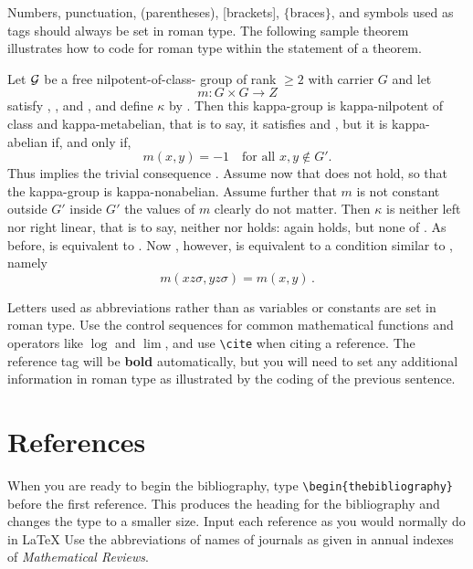 Numbers, punctuation, (parentheses), [brackets], $\{$braces$\}$, and
symbols used as tags should always be set in roman type.  The following
sample theorem illustrates how to code for roman type within the
statement of a theorem.

\begin{lemma}
Let $\cal G$ be a free nilpotent-of-class- group of rank
$\ge 2$ with carrier $G$ and let
$$m : G\times G \to Z$$
satisfy , , and , and define
$\kappa$ by .  Then this kappa-group is kappa-nilpotent
of class  and kappa-metabelian, that is to say, it satisfies
 and , but it is kappa-abelian if, and only if,
$$m(x,y) = -1\quad\text{for all $x, y \notin G'$}.
$$
\rom{(}Thus  implies the trivial consequence
.\rom{)}  Assume now that  does not hold,
so that the kappa-group is kappa-nonabelian.  Assume further that $m$
is not constant outside $G'$ \rom{(}inside $G'$ the values of $m$
clearly do not matter\rom{)}.  Then $\kappa$ is neither left nor right
linear, that is to say, neither  nor  holds:
 again holds, but none of .  As before,
 is equivalent to .  Now , however,
is equivalent to a condition similar to , namely
$$m(xz\sigma, yz\sigma) = m(x,y)\,.
$$
\end{lemma}

Letters used as abbreviations rather than as variables or constants
are set in roman type.  Use the control sequences \cite[p.\ 99]{spivak:jot}
for common mathematical functions and operators like $\log$ and $\lim$,
and use \verb+\cite+ when citing a reference.  The reference tag
will be {\bf bold} automatically, but you will need to set any
additional information in roman type as illustrated by the coding of
the previous sentence.

\section{References}

When you are ready to begin the bibliography, type 
\verb+\begin{thebibliography}+
before the first reference.  This produces the heading for the
bibliography and changes the type to a smaller size.  Input each reference
as you would normally do in \LaTeX{} \cite{lamport:latex}
Use the abbreviations of names of journals as given in annual indexes of
{\it Mathematical Reviews}.


